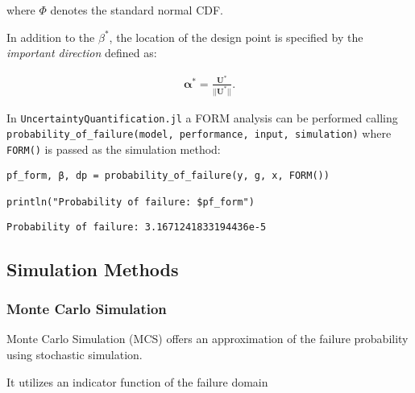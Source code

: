where \(\Phi\) denotes the standard normal CDF.



In addition to the \(\beta^*\), the location of the design point is specified by the \emph{important direction} defined as:



\begin{equation*}
\begin{split}\boldsymbol{\alpha}^* = \frac{\boldsymbol{U}^*}{||\boldsymbol{U}^*||}.\end{split}\end{equation*}


In \texttt{UncertaintyQuantification.jl} a FORM analysis can be performed calling \texttt{probability\_of\_failure(model, performance, input, simulation)} where \texttt{FORM()} is passed as the simulation method:




\begin{verbatim}
pf_form, β, dp = probability_of_failure(y, g, x, FORM())

println("Probability of failure: $pf_form")
\end{verbatim}


\begin{verbatim}
Probability of failure: 3.1671241833194436e-5
\end{verbatim}



\subsection{Simulation Methods}



\label{8677960879144690738}{}


\subsubsection{Monte Carlo Simulation}



\label{5834098574690153248}{}


Monte Carlo Simulation (MCS) offers an approximation of the failure probability using stochastic simulation.



It utilizes an indicator function of the failure domain



